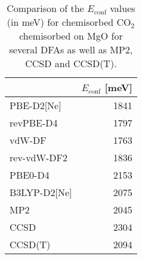 \begin{table}
\caption{\label{tab:econf_co2}Comparison of the $E_\text{conf}$ values (in meV) for chemisorbed CO$_2$ chemisorbed on MgO for several DFAs as well as MP2, CCSD and CCSD(T).}
\begin{tabular}{lr}
\toprule
 & $E_\text{conf}$ [meV] \\ 
\midrule
PBE-D2[Ne] & 1841 \\
revPBE-D4 & 1797 \\
vdW-DF & 1763 \\
rev-vdW-DF2 & 1836 \\
PBE0-D4 & 2153 \\
B3LYP-D2[Ne] & 2075 \\
MP2 & 2045 \\
CCSD & 2304 \\
CCSD(T) & 2094 \\
\bottomrule
\end{tabular}
\end{table}